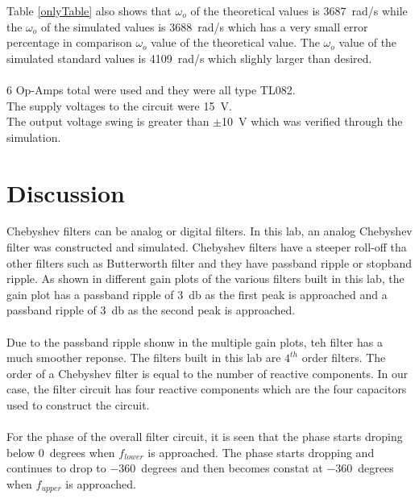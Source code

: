 \documentclass[hidelinks]{article}
\begin{document}
	Table \ref{onlyTable} also shows that $\omega_o$ of the theoretical values is \SI{3687}{\radian/\second} while the $\omega_o$ of the simulated values is \SI{3688}{\radian/\second} which has a very small error percentage in comparison $\omega_o$ value of the theoretical value.
	The $\omega_o$ value of the simulated standard values is \SI{4109}{\radian/\second} which slighly larger than desired.\\\\
	6 Op-Amps total were used and they were all type TL082.\\
	The supply voltages to the circuit were \SI{+15}{\volt}.\\
	The output voltage swing is greater than $\pm$\SI{10}{\volt} which was verified through the simulation.
	
	\section{Discussion}
	Chebyshev filters can be analog or digital filters.
	In this lab, an analog Chebyshev filter was constructed and simulated.
	Chebyshev filters have a steeper roll-off tha other filters such as Butterworth filter and they have passband ripple or stopband ripple.
	As shown in different gain plots of the various filters built in this lab, the gain plot has a passband ripple of \SI{3}{\decibel} as the first peak is approached and a passband ripple of \SI{3}{\decibel} as the second peak is approached.\\\\
	Due to the passband ripple shonw in the multiple gain plots, teh filter has a much smoother reponse.
	The filters built in this lab are $4^{th}$ order filters.
	The order of a Chebyshev filter is equal to the number of reactive components.
	In our case, the filter circuit has four reactive components which are the four capacitors used to construct the circuit.\\\\
	For the phase of the overall filter circuit, it is seen that the phase starts droping below \SI{0}{degrees} when $f_{lower}$ is approached.
	The phase starts dropping and continues to drop to \SI{-360}{degrees} and then becomes constat at \SI{-360}{degrees} when $f_{upper}$ is approached.
	
	\pagebreak
\end{document}
